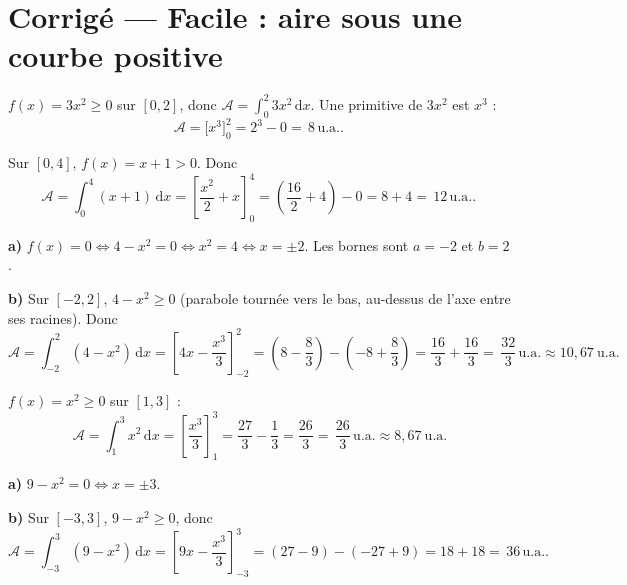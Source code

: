 \documentclass[11pt,a4paper]{article}
\newcommand{\dd}{\mathrm{d}}
\newcommand{\ua}{\,\text{u.a.}}
\begin{document}
\section*{Corrigé — Facile : aire sous une courbe positive}

\begin{corr}[F1]
$f(x)=3x^2\geqslant 0$ sur $[0,2]$, donc $\mathcal{A}=\displaystyle\int_0^2 3x^2\,\dd x$. Une primitive
de $3x^2$ est $x^3$ :
\[
\mathcal{A}=\bigl[x^3\bigr]_0^2=2^3-0=\boxed{\,8\ua.\,}
\]
\end{corr}

\begin{corr}[F2]
Sur $[0,4]$, $f(x)=x+1>0$. Donc
\[
\mathcal{A}=\int_0^4 (x+1)\,\dd x=\left[\frac{x^2}{2}+x\right]_0^4=\left(\frac{16}{2}+4\right)-0
=8+4=\boxed{\,12\ua.\,}
\]
\end{corr}

\begin{corr}[F3]
\textbf{a)} $f(x)=0\Leftrightarrow 4-x^2=0\Leftrightarrow x^2=4\Leftrightarrow x=\pm 2$. Les bornes
sont $a=-2$ et $b=2$.

\textbf{b)} Sur $[-2,2]$, $4-x^2\geqslant 0$ (parabole tournée vers le bas, au-dessus de l'axe entre
ses racines). Donc
\[
\mathcal{A}=\int_{-2}^{2}(4-x^2)\,\dd x=\left[4x-\frac{x^3}{3}\right]_{-2}^{2}
=\left(8-\frac{8}{3}\right)-\left(-8+\frac{8}{3}\right)=\frac{16}{3}+\frac{16}{3}
=\boxed{\,\frac{32}{3}\ua\approx 10{,}67\ \text{u.a.}}
\]

\smallskip
\begin{center}
\end{center}
\end{corr}

\begin{corr}[F4]
$f(x)=x^2\geqslant 0$ sur $[1,3]$ :
\[
\mathcal{A}=\int_1^3 x^2\,\dd x=\left[\frac{x^3}{3}\right]_1^3=\frac{27}{3}-\frac{1}{3}
=\frac{26}{3}=\boxed{\,\frac{26}{3}\ua\approx 8{,}67\ \text{u.a.}}
\]
\end{corr}

\begin{corr}[F5]
\textbf{a)} $9-x^2=0\Leftrightarrow x=\pm 3$.

\textbf{b)} Sur $[-3,3]$, $9-x^2\geqslant 0$, donc
\[
\mathcal{A}=\int_{-3}^{3}(9-x^2)\,\dd x=\left[9x-\frac{x^3}{3}\right]_{-3}^{3}
=\left(27-9\right)-\left(-27+9\right)=18+18=\boxed{\,36\ua.\,}
\]
\end{corr}
\end{document}
